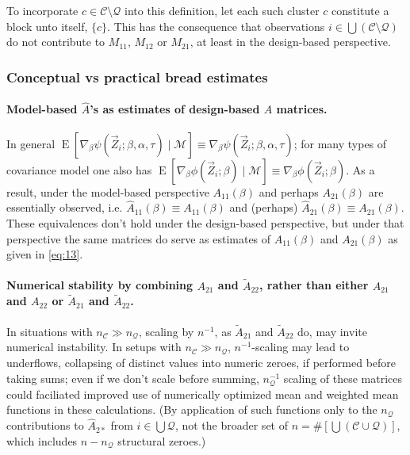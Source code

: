 \documentclass{article}
\newcommand{\EE}{\operatorname{E}}
\begin{document}
To incorporate $c\in \mathcal{C}\setminus\mathcal{Q}$ into this
definition, let each such cluster $c$ constitute a block unto itself,
$\{c\}$. This has the consequence that observations $i
\in \bigcup\left(\mathcal{C}\setminus\mathcal{Q}\right)$ do not
contribute to $M_{11}$, $M_{12}$ or $M_{21}$, at least in the
design-based perspective.

  \subsubsection{Conceptual vs practical bread estimates} \label{sec:conc-vs-pract}
  \paragraph{Model-based $\hat{A}$'s as estimates of design-based $A$ matrices.}%
In general $\EE
[\nabla_{\beta}\psi(\vec{Z}_{i};  \beta, \alpha,\tau ) \mid \mathcal{M}] \equiv
\nabla_{\beta}\psi(\vec{Z}_{i};  \beta, \alpha, \tau )$; for many types of
covariance model one also has $\EE
[\nabla_{\beta}\phi(\vec{Z}_{i};  \beta ) \mid \mathcal{M}] \equiv
\nabla_{\beta}\phi(\vec{Z}_{i};  \beta )$. As a result, under the
model-based perspective
$A_{11}(\beta)$ and perhaps $A_{21}(\beta)$ are essentially observed,
i.e.  $\hat{A}_{11}(\beta) \equiv A_{11}(\beta)$ and (perhaps)
$\hat{A}_{21}(\beta) \equiv A_{21}(\beta)$.   These equivalences don't
hold under the design-based perspective, but under that perspective
the same matrices do serve as estimates of $A_{11}(\beta)$ and
$A_{21}(\beta)$ as given in \eqref{eq:13}. 

\paragraph{Numerical stability by combining ${A}_{21}$ and $\tilde{A}_{22}$, rather than either
  ${A}_{21}$ and ${A}_{22}$ or $\tilde{A}_{21}$ and $\tilde{A}_{22}$.}
  In situations with $n_{\mathcal{C}} \gg n_{\mathcal{Q}}$, scaling
  by $n^{-1}$, as $\tilde{A}_{21}$ and $\tilde{A}_{22}$ do, may
  invite numerical instability. In setups with $n_{\mathcal{C}} \gg
  n_{\mathcal{Q}}$, $n^{-1}$-scaling may lead to underflows,
  collapsing of distinct values into numeric zeroes, if performed
  before taking sums; even if we don't scale before summing,
  $n_{\mathcal{Q}}^{-1}$ scaling of these matrices could faciliated improved
  use of numerically optimized mean and weighted mean functions in
  these calculations.  (By application of such functions only to the
  $n_{\mathcal{Q}}$ contributions to $\hat{A}_{2*}$  from $i \in \bigcup \mathcal{Q}$, not the broader set of $n = \#\left[\bigcup (\mathcal{C}\cup
    \mathcal{Q}) \right]$, which includes $n - n_{\mathcal{Q}}$ structural
  zeroes.)
\end{document}
